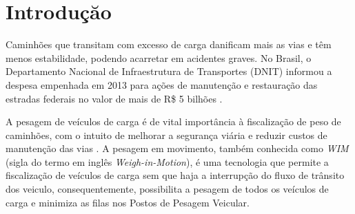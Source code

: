 \documentclass{ufscThesis}
\begin{document}
\capa  
\folhaderosto[comficha] %

\newpage
%
\newpage

\folhaaprovacao
\paginadedicatoria
\paginaagradecimento
\paginaepigrafe
\paginaresumo
\paginaabstract
\listadefiguras
\listadetabelas 
\listadeabreviaturas
\listadesimbolos
\sumario



\chapter{Introduçăo}\label{introducao}
Caminhões que transitam com excesso de carga danificam mais as vias e têm menos estabilidade, podendo acarretar em acidentes graves. No Brasil, o Departamento Nacional de Infraestrutura de Transportes (DNIT) informou a despesa empenhada em 2013 para ações de manutenção e restauração das estradas federais no valor de mais de R\$ 5 bilhões \cite{tech:relatorio-de-gestao-do-exercicio-de-2013}.

A pesagem de veículos de carga é de vital importância à fiscalização de peso de caminhões, com o intuito de melhorar a segurança viária e reduzir custos de manutenção das vias \cite{techreport:jacob2002wave}. A pesagem em movimento, também conhecida como \textit{WIM} (sigla do termo em inglês \textit{Weigh-in-Motion}), é uma tecnologia que permite a fiscalização de veículos de carga sem que haja a interrupção do fluxo de trânsito dos veiculo, consequentemente, possibilita a pesagem de todos os veículos de carga e minimiza as filas nos Postos de Pesagem Veicular.
\end{document}
